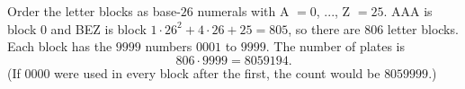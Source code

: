 Order the letter blocks as base-$26$ numerals with A $=0$, ..., Z $=25$. AAA is block $0$ and BEZ is block $1\cdot26^2+4\cdot26+25=805$, so there are $806$ letter blocks. Each block has the $9999$ numbers $0001$ to $9999$. The number of plates is
\[806\cdot9999=\boxed{8059194}.\]
(If $0000$ were used in every block after the first, the count would be $8059999$.)
